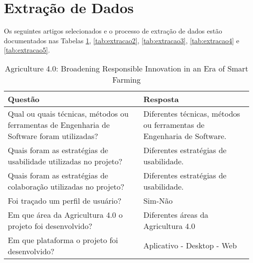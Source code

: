 \documentclass[12pt]{article}
\begin{document}
\section{Extração de Dados}

Os seguintes artigos selecionados e o processo de extração de dados estão documentados nas Tabelas \ref{tab:extracao1}, \ref{tab:extracao2}, \ref{tab:extracao3}, \ref{tab:extracao4} e \ref{tab:extracao5}.

\begin{table}[!htb]
	\footnotesize
  \centering
	\begin{tabular}{|p{8cm}|p{6cm}|}
		\hline
		\textbf{Questão}                                                                           & \textbf{Resposta}                                                      \\ \hline
		Qual ou quais técnicas, métodos ou ferramentas de Engenharia de Software foram utilizadas? & Diferentes técnicas, métodos ou ferramentas de Engenharia de Software. \\ \hline
		Quais foram as estratégias de usabilidade utilizadas no projeto?                           & Diferentes estratégias de usabilidade.                                 \\ \hline
		Quais foram as estratégias de colaboração utilizadas no projeto?                           & Diferentes estratégias de usabilidade.                                 \\ \hline
		Foi traçado um perfil de usuário?                                                          & Sim-Não                                                                \\ \hline
		Em que área da Agricultura 4.0 o projeto foi desenvolvido?                                 & Diferentes áreas da Agricultura 4.0                                    \\ \hline
		Em que plataforma o projeto foi desenvolvido?                                              & Aplicativo - Desktop - Web                                 \\ \hline
		\end{tabular}
  \caption{Agriculture 4.0: Broadening Responsible Innovation in an Era of Smart Farming}
  \label{tab:extracao1}
\end{table}
\end{document}
